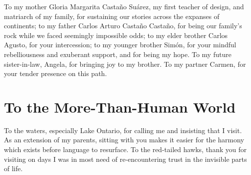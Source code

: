 To my mother Gloria Margarita Castaño Suárez, my first teacher of design, and matriarch of my family, for sustaining our stories across the expanses of continents; to my father Carlos Arturo Castaño Castaño, for being our family’s rock while we faced seemingly impossible odds; to my elder brother Carlos Agusto, for your intercession; to my younger brother Simón, for your mindful rebelliousness and exuberant support, and for being my hope. To my future sister-in-law, Angela, for bringing joy to my brother. To my partner Carmen, for your tender presence on this path.

\section*{To the More-Than-Human World}
To the waters, especially Lake Ontario, for calling me and insisting that I visit. As an extension of my parents, sitting with you makes it easier for the harmony which exists before language to resurface. To the red-tailed hawks, thank you for visiting on days I was in most need of re-encountering trust in the invisible parts of life. 